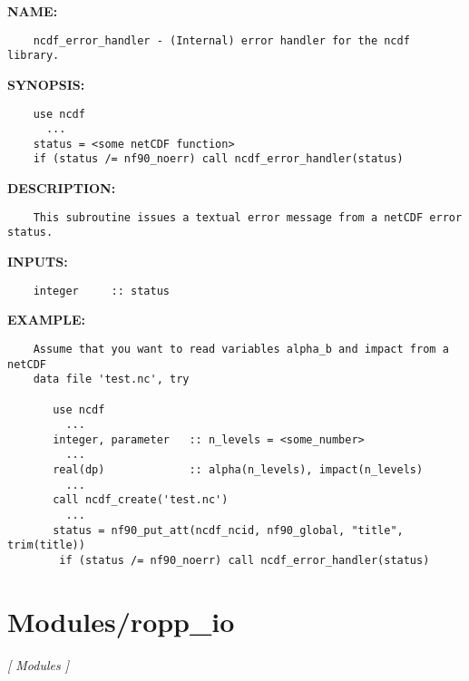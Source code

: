 \label{ch:robo76}
\label{ch:Misc_ncdf_error_handler}
\textbf{NAME:}\hspace{0.08in}\begin{Verbatim}
    ncdf_error_handler - (Internal) error handler for the ncdf library.
\end{Verbatim}
\textbf{SYNOPSIS:}\hspace{0.08in}\begin{Verbatim}
    use ncdf
      ...
    status = <some netCDF function>
    if (status /= nf90_noerr) call ncdf_error_handler(status)
\end{Verbatim}
\textbf{DESCRIPTION:}\hspace{0.08in}\begin{Verbatim}
    This subroutine issues a textual error message from a netCDF error status.
\end{Verbatim}
\textbf{INPUTS:}\hspace{0.08in}\begin{Verbatim}
    integer     :: status
\end{Verbatim}
\textbf{EXAMPLE:}\hspace{0.08in}\begin{Verbatim}
    Assume that you want to read variables alpha_b and impact from a netCDF
    data file 'test.nc', try

       use ncdf
         ...
       integer, parameter   :: n_levels = <some_number>
         ...
       real(dp)             :: alpha(n_levels), impact(n_levels)
         ...
       call ncdf_create('test.nc')
         ...
       status = nf90_put_att(ncdf_ncid, nf90_global, "title", trim(title))
        if (status /= nf90_noerr) call ncdf_error_handler(status)
\end{Verbatim}
\section{Modules/ropp\_io}
\textsl{[ Modules ]}

